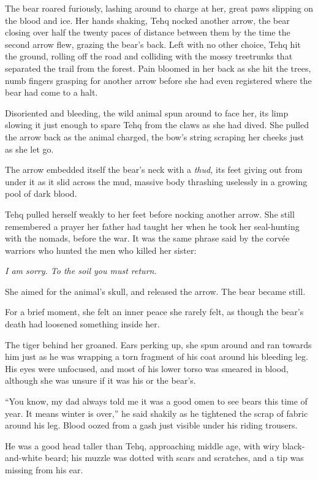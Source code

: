 The bear roared furiously, lashing around to charge at her, great paws slipping on the blood and ice. Her hands shaking, Tehq nocked another arrow, the bear closing over half the twenty paces of distance between them by the time the second arrow flew, grazing the bear's back. Left with no other choice, Tehq hit the ground, rolling off the road and colliding with the mossy treetrunks that separated the trail from the forest. Pain bloomed in her back as she hit the trees, numb fingers grasping for another arrow before she had even registered where the bear had come to a halt.

Disoriented and bleeding, the wild animal spun around to face her, its limp slowing it just enough to spare Tehq from the claws as she had dived. She pulled the arrow back as the animal charged, the bow's string scraping her cheeks just as she let go.

The arrow embedded itself the bear's neck with a \emph{thud,} its feet giving out from under it as it slid across the mud, massive body thrashing uselessly in a growing pool of dark blood.

Tehq pulled herself weakly to her feet before nocking another arrow. She still remembered a prayer her father had taught her when he took her seal-hunting with the nomads, before the war. It was the same phrase said by the corvée warriors who hunted the men who killed her sister:

\emph{I am sorry. To the soil you must return.}

She aimed for the animal's skull, and released the arrow. The bear became still.

For a brief moment, she felt an inner peace she rarely felt, as though the bear's death had loosened something inside her.

The tiger behind her groaned. Ears perking up, she spun around and ran towards him just as he was wrapping a torn fragment of his coat around his bleeding leg. His eyes were unfocused, and most of his lower torso was smeared in blood, although she was unsure if it was his or the bear's.

``You know, my dad always told me it was a good omen to see bears this time of year. It means winter is over,'' he said shakily as he tightened the scrap of fabric around his leg. Blood oozed from a gash just visible under his riding trousers.

He was a good head taller than Tehq, approaching middle age, with wiry black-and-white beard; his muzzle was dotted with scars and scratches, and a tip was missing from his ear.

